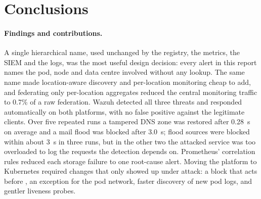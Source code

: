 \section{Conclusions}
\label{sec:concl}

\paragraph{Findings and contributions.}
A single hierarchical name, used unchanged by the registry, the metrics, the SIEM and the logs, was
the most useful design decision: every alert in this report names the pod, node and data centre
involved without any lookup. The same name made location-aware discovery and per-location
monitoring cheap to add, and federating only per-location aggregates reduced the central monitoring
traffic to 0.7\% of a raw federation. Wazuh detected all three threats and responded automatically
on both platforms, with no false positive against the legitimate clients. Over five repeated runs a
tampered DNS zone was restored after 0.28~s on average and a mail flood was blocked after 3.0~s;
flood sources were blocked within about 3~s in three runs, but in the other two the attacked
service was too overloaded to log the requests the detection depends on. Prometheus' correlation rules reduced each storage failure to one root-cause
alert. Moving the platform to Kubernetes required changes that only showed up under attack: a
block that acts before , an exception for the pod network, faster discovery of new
pod logs, and gentler liveness probes.

